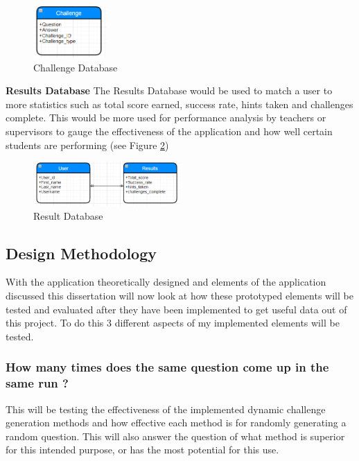 \documentclass[12pt,a4paper]{article}
\begin{document}
\begin{figure}[!ht]
    \centering
    \includegraphics[width=0.25\textwidth]{Figs/Challenge_Db.PNG} 
    \caption{Challenge Database} 
    \label{ChallengeDB}
\end{figure} 

\textbf{Results Database}   
The Results Database would be used to match a user to more statistics such as total score earned, success rate, hints taken and challenges complete. This would be more used for performance analysis by teachers or supervisors to gauge the effectiveness of the application and how well certain students are performing (see Figure \ref{ResultsDB})

\begin{figure}[!ht]
    \centering
    \includegraphics[width=0.5\textwidth]{Figs/Result_Db.PNG} 
    \caption{Result Database} 
    \label{ResultsDB}
\end{figure} 






\subsection{Design Methodology} 
With the application theoretically designed and elements of the application discussed this dissertation will now look at how these prototyped elements will be tested and evaluated after they have been implemented to get useful data out of this project. To do this 3 different aspects of my implemented elements will be tested. 
\subsubsection{How many times does the same question come up in the same run ?} This will be testing the effectiveness of the implemented dynamic challenge generation methods and how effective each method is for randomly generating a random question. This will also answer the question of what method is superior for this intended purpose, or has the most potential for this use.  
\end{document}

